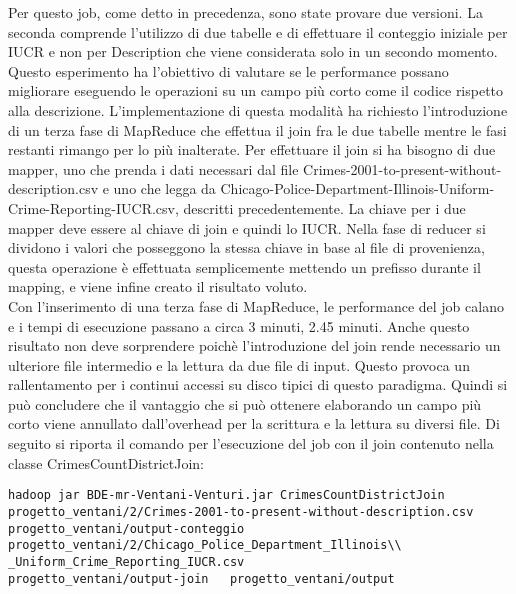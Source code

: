 \documentclass[10pt]{article}
\begin{document}
Per questo job, come detto in precedenza, sono state provare due versioni. La seconda comprende l'utilizzo di due tabelle e di effettuare il conteggio iniziale per IUCR e non per Description che viene considerata solo in un secondo momento. Questo esperimento ha l'obiettivo di valutare se le performance possano migliorare eseguendo le operazioni su un campo più corto come il codice rispetto alla descrizione.
L'implementazione di questa modalità ha richiesto l'introduzione di un terza fase di MapReduce che effettua il join fra le due tabelle mentre  le fasi restanti rimango per lo più inalterate. Per effettuare il join si ha bisogno di due mapper, uno che prenda i dati necessari dal file 
Crimes-2001-to-present-without-description.csv e uno che legga da Chicago-Police-Department-Illinois-Uniform-Crime-Reporting-IUCR.csv, descritti precedentemente. La chiave per i due mapper deve essere al chiave di join e quindi lo IUCR. Nella fase di reducer si dividono i valori che posseggono la stessa chiave in base al file di provenienza, questa operazione è effettuata semplicemente mettendo un prefisso durante il mapping, e viene infine creato il risultato voluto. \\
Con l'inserimento di una terza fase di MapReduce, le performance del job calano e i tempi di esecuzione passano a circa 3 minuti, 2.45 minuti.
Anche questo risultato non deve sorprendere poichè l'introduzione del join rende necessario un ulteriore file intermedio e la lettura da due file di input. Questo provoca un rallentamento per i continui accessi su disco tipici di questo paradigma. Quindi si può concludere che il vantaggio che si può ottenere elaborando un campo più corto viene annullato dall'overhead per la scrittura e la lettura su diversi file.
Di seguito si riporta il comando per l'esecuzione del job con il join contenuto nella classe CrimesCountDistrictJoin:
\begin{lstlisting}
hadoop jar BDE-mr-Ventani-Venturi.jar CrimesCountDistrictJoin 
progetto_ventani/2/Crimes-2001-to-present-without-description.csv 
progetto_ventani/output-conteggio 
progetto_ventani/2/Chicago_Police_Department_Illinois\\
_Uniform_Crime_Reporting_IUCR.csv
progetto_ventani/output-join   progetto_ventani/output
\end{lstlisting}



\end{document}
